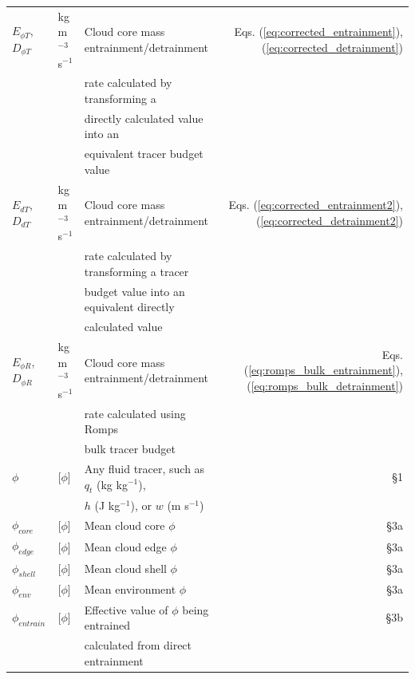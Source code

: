 \documentclass[12pt]{article}
\begin{document}
\begin{appendix}
\begin{table}[t]
\begin{center}
\begin{tabular}{lllr}
 $E_{\phi T}$, $D_{\phi T}$
    & kg m$^{-3}$ s$^{-1}$ 
    & Cloud core mass entrainment/detrainment  
    & Eqs. (\ref{eq:corrected_entrainment}), (\ref{eq:corrected_detrainment}) \\
   && rate calculated by transforming a   & \\
   && directly calculated value into an  & \\
   && equivalent tracer budget value & \\
     
 $E_{d T}$, $D_{d T}$
    & kg m$^{-3}$ s$^{-1}$ 
    & Cloud core mass entrainment/detrainment 
    & Eqs. (\ref{eq:corrected_entrainment2}), (\ref{eq:corrected_detrainment2}) \\
   && rate calculated by transforming a tracer & \\
   && budget value into an equivalent directly  & \\
   && calculated value & \\

 $E_{\phi R}$, $D_{\phi R}$     
    & kg m$^{-3}$ s$^{-1}$ 
    & Cloud core mass entrainment/detrainment
    & Eqs. (\ref{eq:romps_bulk_entrainment}), (\ref{eq:romps_bulk_detrainment}) \\
   && rate calculated using Romps & \\
   && bulk tracer budget & \\

 $\phi$    
    & [$\phi$]            
    & Any fluid tracer, such as $q_t$ (kg kg$^{-1}$), 
    & \S 1 \\
   && $h$ (J kg$^{-1}$), or $w$ (m s$^{-1}$) & \\

 $\phi_{core}$    
    & [$\phi$]            
    & Mean cloud core $\phi$
    & \S 3a \\

 $\phi_{edge}$    
    & [$\phi$]            
    & Mean cloud edge $\phi$
    & \S 3a \\

 $\phi_{shell}$   
    & [$\phi$]            
    & Mean cloud shell $\phi$
    & \S 3a \\

 $\phi_{env}$     
    & [$\phi$]            
    & Mean environment $\phi$
    & \S 3a \\

 $\phi_{entrain}$ 
    & [$\phi$]            
    & Effective value of $\phi$ being entrained
    & \S 3b \\
   && calculated from direct entrainment& \\


\end{tabular}
\end{center}
\end{table}
\end{appendix}
\end{document}
